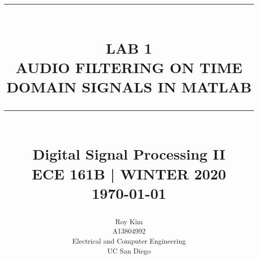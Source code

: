 \begin{titlepage}
    \newcommand{\HRule}[1]{\rule{\linewidth}{#1}} 	%
    \makeatletter							%
    \def\printtitle{%
        {\centering \@title\par}}
    \makeatother									
    
    \makeatletter							%
    \def\printauthor{%
        {\centering \large \@author}}				
    \makeatother							

    \title{	\normalsize \textsc{} 	%
    		 	\\[2.0cm]								%
    			\HRule{0.5pt} \\						%
    			\LARGE \textbf{\uppercase{Lab 1\\ Audio Filtering on Time Domain Signals in MATLAB}}	%
    			\HRule{2pt} \\ [0.5cm]		%
    			\normalsize Digital Signal Processing II\\
    			ECE 161B | WINTER 2020\\
    			\today			%
    		}
    
    \author{
    		Roy Kim\\	
    		A13804992\\
    		Electrical and Computer Engineering\\	
    		UC San Diego\\
    }
    
    \thispagestyle{empty}		%
    
    \printtitle					%
      	\vfill
    \printauthor				%
    \newpage

\end{titlepage}